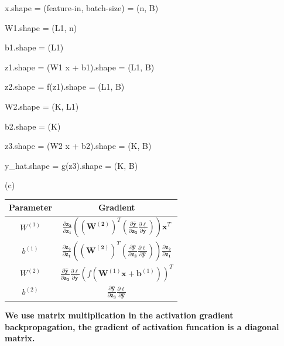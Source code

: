 x.shape = (feature-in, batch-size) = (n, B) 

W1.shape = (L1, n)

b1.shape = (L1)

z1.shape = (W1 x + b1).shape = (L1, B)

z2.shape = f(z1).shape = (L1, B)

W2.shape = (K, L1)

b2.shape = (K)

z3.shape = (W2 x + b2).shape = (K, B)

y\_hat.shape = g(z3).shape = (K, B)


(c)


\begin{center}
    \begin{tabular}{ |c |c | }
    \hline
    Parameter &  Gradient \\
    \hline
    $W^{(1)}$ & $  \frac{\partial \bm{z_2}}{\partial \bm{z_1}}  (\bm{(W^{(2)})}^T ( \frac{\partial \bm{\hat y}}{\partial \bm{z_3}} \frac{\partial \ell}{\partial \bm{\hat y}})) \bm{x}^T $\\
    \hline
    $b^{(1)}$ & $  \frac{\partial \bm{z_2}}{\partial \bm{z_1}} (\bm{(W^{(2)})}^T (\frac{\partial \bm{\hat y}}{\partial \bm{z_3}} \frac{\partial \ell}{\partial \bm{\hat y}} ))  \frac{\partial \bm{z_2}}{\partial \bm{z_1}} $ \\ 
    \hline
    $W^{(2)}$ & $ \frac{\partial \bm{\hat y}}{\partial \bm{z_3}} \frac{\partial \ell}{\partial \bm{\hat y}} (f(\bm{W}^{(1)}\bm{x} + \bm{b}^{(1)}))^T$  \\
    \hline
    $b^{(2)}$ & $  \frac{\partial \bm{\hat y}}{\partial \bm{z_3}}\frac{\partial \ell}{\partial \bm{\hat y}}$\\
    \hline
    \end{tabular}
\end{center}

\textbf{We use matrix multiplication in the activation gradient backpropagation, the gradient of activation funcation is a diagonal matrix.}

